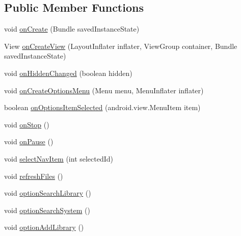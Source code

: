 \subsection*{Public Member Functions}
\begin{DoxyCompactItemize}
\item 
void \hyperlink{classandroid_1_1app_1_1printerapp_1_1library_1_1_library_fragment_aadaae122f5908cdf23724ef49ab9928d}{on\+Create} (Bundle saved\+Instance\+State)
\item 
View \hyperlink{classandroid_1_1app_1_1printerapp_1_1library_1_1_library_fragment_a9e7377265a6fe71724ad09294d7ea191}{on\+Create\+View} (Layout\+Inflater inflater, View\+Group container, Bundle saved\+Instance\+State)
\item 
void \hyperlink{classandroid_1_1app_1_1printerapp_1_1library_1_1_library_fragment_ac822dba54d0f9a8d9611dc9e6bb62d2a}{on\+Hidden\+Changed} (boolean hidden)
\item 
void \hyperlink{classandroid_1_1app_1_1printerapp_1_1library_1_1_library_fragment_a06defdef07a86d6ddb57906414a2d2a4}{on\+Create\+Options\+Menu} (Menu menu, Menu\+Inflater inflater)
\item 
boolean \hyperlink{classandroid_1_1app_1_1printerapp_1_1library_1_1_library_fragment_a5ee2f7c833497f2ac62c3bea43bb5761}{on\+Options\+Item\+Selected} (android.\+view.\+Menu\+Item item)
\item 
void \hyperlink{classandroid_1_1app_1_1printerapp_1_1library_1_1_library_fragment_add3ecfae06ccdb602a887a33e6e6a589}{on\+Stop} ()
\item 
void \hyperlink{classandroid_1_1app_1_1printerapp_1_1library_1_1_library_fragment_a7b50e3a0c32f3b1362baf064705f0a76}{on\+Pause} ()
\item 
void \hyperlink{classandroid_1_1app_1_1printerapp_1_1library_1_1_library_fragment_a56df0a0a8b60db069e54b8354616332b}{select\+Nav\+Item} (int selected\+Id)
\item 
void \hyperlink{classandroid_1_1app_1_1printerapp_1_1library_1_1_library_fragment_afaddc4be6049cecbc94e467a8751e043}{refresh\+Files} ()
\item 
void \hyperlink{classandroid_1_1app_1_1printerapp_1_1library_1_1_library_fragment_aee93c9e7a6c01a04af0a887baf4a072d}{option\+Search\+Library} ()
\item 
void \hyperlink{classandroid_1_1app_1_1printerapp_1_1library_1_1_library_fragment_ac408a4729f1cf04d0cb42cdf2b0580ef}{option\+Search\+System} ()
\item 
void \hyperlink{classandroid_1_1app_1_1printerapp_1_1library_1_1_library_fragment_afb7e9ed51da5aac609e3a52b0d2b66c7}{option\+Add\+Library} ()

\end{DoxyCompactItemize}

